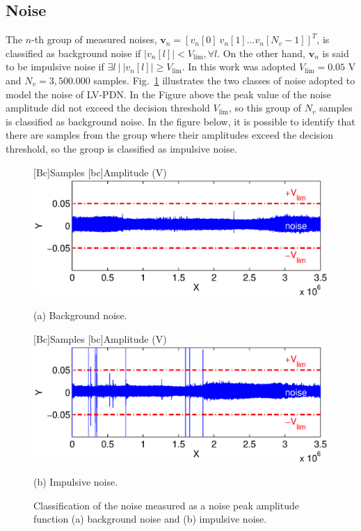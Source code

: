 \documentclass[journal]{IEEEtran}
\begin{document}
\subsection{Noise}\label{sec-ruido}
The $n$-th group of measured noises, $\mathbf{v}_n = [v_n[0] \ v_n[1] \ldots v_n[N_v-1]]^T$, is classified as background noise if $|v_n[l]|<V_{\lim}, \forall l$. On the other hand, $\mathbf{v}_n$ is said to be impulsive noise if $\exists l \ | \ |v_n[l]|\geq V_{\lim}$. In this work was adopted $V_{\lim} = 0.05$ V and  $N_v = 3,500.000$ samples. Fig.~\ref{Fig:limiteDeciRuidos} illustrates the two classes of noise adopted to model the noise of \ac{LV-PDN}. In the Figure above the peak value of the noise amplitude did not exceed the decision threshold $V_{\lim}$, so this group of $N_v$ samples is classified as background noise. In the figure below, it is possible to identify that there are samples from the group where their amplitudes exceed the decision threshold, so the group is classified as impulsive noise. 
\begin{figure} [!htb]
    \begin{minipage}[b]{\linewidth}
    [Bc]{Samples}    
    [bc]{Amplitude (V)}
    \includegraphics[width=\linewidth]{Figuras/limiteDeciRuidoRimpuls11.eps}
    \begin{center} \vspace{-.4cm}
    (a) Background noise.
    \end{center}
	\vfill
    \end{minipage} 
    \begin{minipage}[b]{\linewidth}
    [Bc]{Samples}    
    [bc]{Amplitude (V)}
    \includegraphics[width=\linewidth]{Figuras/limiteDeciRuidoRimpuls6.eps}
    \begin{center}\vspace{-.4cm}
    (b) Impulsive noise.
    \end{center}
    
    \end{minipage}
    \caption{Classification of the noise measured as a noise peak amplitude function  (a) background noise and (b) impulsive noise.}
    \label{Fig:limiteDeciRuidos}
\end{figure}
\end{document}
